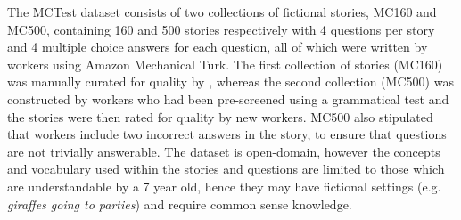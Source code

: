 The MCTest dataset consists of two collections of fictional stories, MC160 and MC500, containing 160 and 500 stories respectively with 4 questions per story and 4 multiple choice answers for each question, all of which were written by workers using Amazon Mechanical Turk.  The first collection of stories (MC160) was manually curated for quality by \cite{mctest}, whereas the second collection (MC500) was constructed by workers who had been pre-screened using a grammatical test and the stories were then rated for quality by new workers. MC500 also stipulated that workers include two incorrect answers in the story, to ensure that questions are not trivially answerable. The dataset is open-domain, however the concepts and vocabulary used within the stories and questions are limited to those which are understandable by a 7 year old, hence they may have fictional settings (e.g. {\em giraffes going to parties}) and require common sense knowledge.